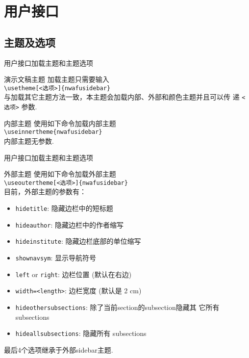 \section{用户接口}
\subsection{主题及选项}
\begin{frame}{用户接口}{加载主题和主题选项}
  \begin{block}{演示文稿主题}
    加载主题只需要输入\\
    {\tt \textbackslash usetheme[<选项>]\{nwafusidebar\}}\\
    与加载其它主题方法一致，本主题会加载内部、外部和颜色主题并且可以传
    递 {\tt <选项>} 参数.
  \end{block}
  \begin{block}{内部主题}
    使用如下命令加载内部主题\\
    {\tt \textbackslash useinnertheme\{nwafusidebar\}}\\
    内部主题无参数.
  \end{block}
\end{frame}

\begin{frame}{用户接口}{加载主题和主题选项}
  \begin{block}{外部主题}
    使用如下命令加载外部主题\\
    {\tt \textbackslash useoutertheme[<选项>]\{nwafusidebar\}}\\
    目前，外部主题的参数有：
    \begin{itemize}
      \scriptsize
    \item {\tt hidetitle}: 隐藏边栏中的短标题
    \item {\tt hideauthor}: 隐藏边栏中的作者缩写
    \item {\tt hideinstitute}: 隐藏边栏底部的单位缩写
    \item {\tt shownavsym}: 显示导航符号
    \item {\tt left} or {\tt right}: 边栏位置 (默认在右边)
    \item {\tt width=<length>}: 边栏宽度 (默认是 2 cm)
    \item {\tt hideothersubsections}: 除了当前section的subsection隐藏其
      它所有 subsections
    \item {\tt hideallsubsections}: 隐藏所有 subsections
    \end{itemize}
    最后4个选项继承于外部sidebar主题.
  \end{block}
\end{frame}
